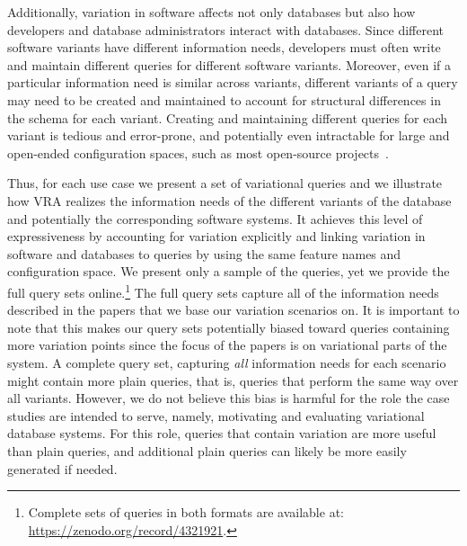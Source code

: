 Additionally, variation in software affects not only databases but also how developers and
database administrators interact with databases.
%
Since different software variants have different information needs, developers
must often write and maintain different queries for different software
variants. Moreover, even if a particular information need is similar across
variants, different variants of a query may need to be created and maintained
to account for structural differences in the schema for each variant.
%
Creating and maintaining different queries for each variant is tedious and
error-prone, and potentially even intractable for large and open-ended
configuration spaces, such as most open-source projects~\cite{dbDecay16Stonebraker}.

%
Thus, for each use case we present a set of variational queries 
and we illustrate how VRA realizes the
information needs of the different variants of the database and potentially the 
corresponding software systems.
%
It achieves this level of expressiveness by accounting 
for variation explicitly and linking variation in software and databases to
queries by using the same feature names and configuration space.
%
We present only a  sample of the queries,
yet we provide the full query sets online.\footnote{Complete sets of queries in both formats are available at: \url{https://zenodo.org/record/4321921}.} 
%
The full query sets capture all of the information needs described in the
papers that  we base our variation scenarios on. It is important to note that
this makes our query sets potentially biased toward queries containing more
variation points since the focus of the papers is on variational parts of the
system. A complete query set, capturing \emph{all}
information needs for each scenario might contain more plain queries, that is,
queries that perform the same way over all variants.
%
However, we do not believe this bias is harmful for the role the case studies
are intended to serve, namely, motivating and evaluating variational database
systems. For this role, queries that contain variation are more useful than
plain queries, and additional plain queries can likely be more easily generated
if needed.

